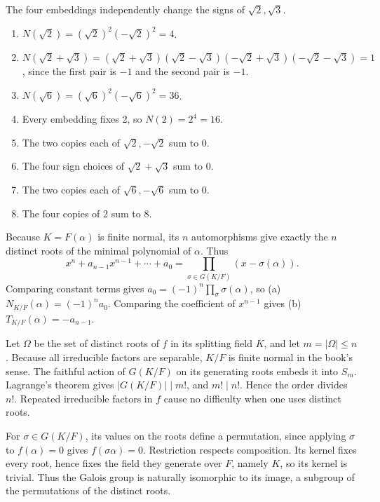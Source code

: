The four embeddings independently change the signs of $\sqrt2,\sqrt3$.
\begin{enumerate}[label=(\alph*)]
\item $N(\sqrt2)=(\sqrt2)^2(-\sqrt2)^2=4$.
\item $N(\sqrt2+\sqrt3)=(\sqrt2+\sqrt3)(\sqrt2-\sqrt3)(-\sqrt2+\sqrt3)(-\sqrt2-\sqrt3)=1$, since the first pair is $-1$ and the second pair is $-1$.
\item $N(\sqrt6)=(\sqrt6)^2(-\sqrt6)^2=36$.
\item Every embedding fixes 2, so $N(2)=2^4=16$.
\item The two copies each of $\sqrt2,-\sqrt2$ sum to 0.
\item The four sign choices of $\sqrt2+\sqrt3$ sum to 0.
\item The two copies each of $\sqrt6,-\sqrt6$ sum to 0.
\item The four copies of 2 sum to 8.
\end{enumerate}

Because $K=F(\alpha)$ is finite normal, its $n$ automorphisms give exactly the $n$ distinct roots of the minimal polynomial of $\alpha$. Thus
\[x^n+a_{n-1}x^{n-1}+\cdots+a_0=\prod_{\sigma\in G(K/F)}(x-\sigma(\alpha)).\]
Comparing constant terms gives $a_0=(-1)^n\prod_\sigma\sigma(\alpha)$, so (a) $N_{K/F}(\alpha)=(-1)^na_0$. Comparing the coefficient of $x^{n-1}$ gives (b) $T_{K/F}(\alpha)=-a_{n-1}$.

Let $\Omega$ be the set of distinct roots of $f$ in its splitting field $K$, and let $m=|\Omega|\le n$. Because all irreducible factors are separable, $K/F$ is finite normal in the book's sense. The faithful action of $G(K/F)$ on its generating roots embeds it into $S_m$. Lagrange's theorem gives $|G(K/F)|\mid m!$, and $m!\mid n!$. Hence the order divides $n!$. Repeated irreducible factors in $f$ cause no difficulty when one uses distinct roots.

For $\sigma\in G(K/F)$, its values on the roots define a permutation, since applying $\sigma$ to $f(\alpha)=0$ gives $f(\sigma\alpha)=0$. Restriction respects composition. Its kernel fixes every root, hence fixes the field they generate over $F$, namely $K$, so its kernel is trivial. Thus the Galois group is naturally isomorphic to its image, a subgroup of the permutations of the distinct roots.

